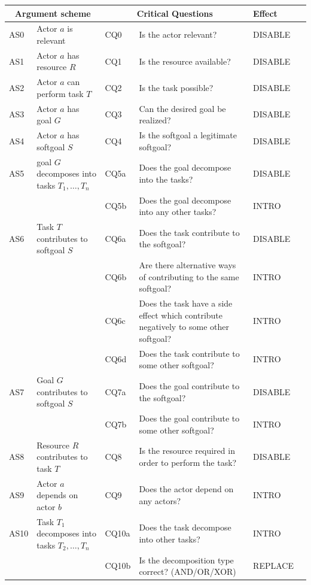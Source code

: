 \begin{table}[h]
\centering
\begin{tabularx}{\textwidth}{|l|l|l|X|l|l|}
\hline
\multicolumn{2}{|c|}{\textbf{Argument scheme}} & \multicolumn{2}{c|}{\textbf{Critical Questions}} & \textbf{Effect}\\
\hline
AS0 & Actor $a$ is relevant & CQ0 &Is the actor relevant? & DISABLE\\
\hline
AS1 & Actor $a$ has resource $R$ & CQ1 &Is the resource available? & DISABLE\\
\hline
AS2 & Actor $a$ can perform task $T$ & CQ2 &Is the task possible? & DISABLE\\
\hline
AS3 & Actor $a$ has goal $G$ & CQ3 & Can the desired goal be realized? & DISABLE\\
\hline
AS4 & Actor $a$ has softgoal $S$ & CQ4 & Is the softgoal a legitimate softgoal?& DISABLE\\
\hline
\hline
AS5 & goal $G$ decomposes into tasks $T_1,\ldots,T_n$ & CQ5a & Does the goal decompose into the tasks?& DISABLE\\
& & CQ5b & Does the goal decompose into any other tasks?& INTRO\\
\hline
AS6 & Task $T$ contributes to softgoal $S$& CQ6a & Does the task contribute to the softgoal?& DISABLE\\
&& CQ6b & Are there alternative ways of contributing to the same softgoal?& INTRO \\
&& CQ6c & Does the task have a side effect which contribute negatively to some other softgoal?& INTRO\\
&& CQ6d & Does the task contribute to some other softgoal?& INTRO\\
\hline
AS7 & Goal $G$ contributes to softgoal $S$ & CQ7a & Does the goal contribute to the softgoal?& DISABLE\\
&& CQ7b & Does the goal contribute to some other softgoal?& INTRO\\
\hline
AS8 & Resource $R$ contributes to task $T$ & CQ8 & Is the resource required in order to perform the task?& DISABLE\\
\hline
AS9 & Actor $a$ depends on actor $b$ & CQ9 & Does the actor depend on any actors?& INTRO\\
\hline
AS10 & Task $T_1$ decomposes into tasks $T_2,\ldots,T_n$ & CQ10a & Does the task decompose into other tasks?& INTRO\\
 &  & CQ10b & Is the decomposition type correct? (AND/OR/XOR)& REPLACE\\
\hline

\end{tabularx}
\end{table}
